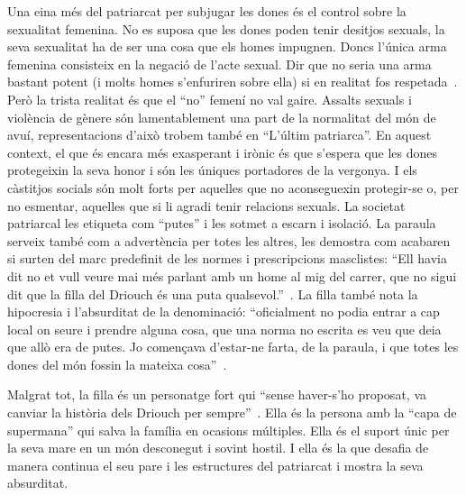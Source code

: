 Una eina més del patriarcat per subjugar les dones és el control sobre la sexualitat femenina.
No es suposa que les dones poden tenir desitjos sexuals, la seva sexualitat ha de ser una cosa que els homes impugnen.
Doncs l'única arma femenina consisteix en la negació de l'acte sexual.
Dir que no seria una arma bastant potent (i molts homes s'enfuriren sobre ella) si en realitat fos respetada~\autocite{Penny2014}.
Però la trista realitat és que el ``no'' femení no val gaire.
Assalts sexuals i violència de gènere són lamentablement una part de la normalitat del món de avuí, representacions d'això trobem també en ``L'últim patriarca''.
En aquest context, el que és encara més exasperant i irònic és que s'espera que les dones protegeixin la seva honor i són les úniques portadores de la vergonya.
I els càstitjos socials són molt forts per aquelles que no aconseguexin protegir-se o, per no esmentar, aquelles que si li agradi tenir relacions sexuals.
La societat patriarcal les etiqueta com ``putes'' i les sotmet a escarn i isolació.
La paraula serveix també com a advertència per totes les altres, les demostra com acabaren si surten del marc predefinit de les normes i prescripcions masclistes:
``Ell havia dit no et vull veure mai més parlant amb un home al mig del carrer, que no sigui dit que la filla del Driouch és una puta qualsevol.''~\autocite[269]{ElHachmi2008}.
La filla també nota la hipocresia i l'absurditat de la denominació:
``oficialment no podia entrar a cap local on seure i prendre alguna cosa, que una norma no escrita es veu que deia que allò era de putes. Jo començava d'estar-ne farta, de la paraula, i que totes les dones del món fossin la mateixa cosa''~\autocite[285]{ElHachmi2008}.


Malgrat tot, la filla és un personatge fort qui ``sense haver-s'ho proposat, va canviar la història dels Driouch per sempre''~\autocite[7]{ElHachmi2008}.
Ella és la persona amb la ``capa de supermana'' qui salva la família en ocasions múltiples.
Ella és el suport únic per la seva mare en un món desconegut i sovint hostil.
I ella és la que desafia de manera continua el seu pare i les estructures del patriarcat i mostra la seva absurditat.


